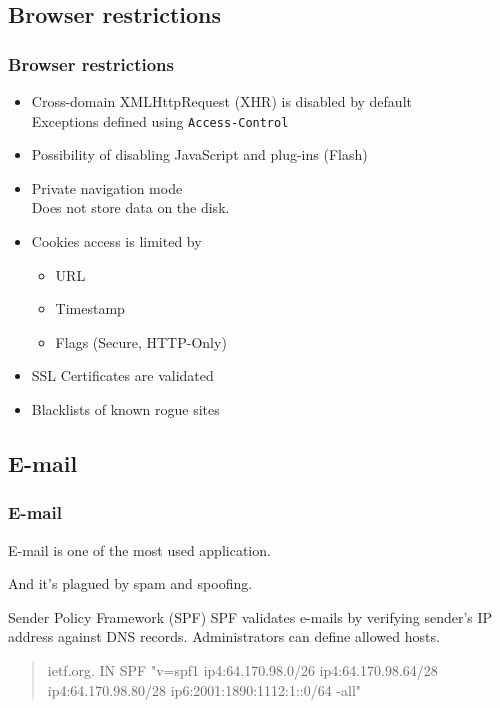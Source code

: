 \subsection{Browser restrictions}

\begin{frame}
\frametitle{Browser restrictions}
\begin{itemize}
\item Cross-domain XMLHttpRequest (XHR) is disabled by default
	\\ Exceptions defined using \texttt{Access-Control}
\item Possibility of disabling JavaScript and plug-ins (Flash)
\item Private navigation mode
	\\ Does not store data on the disk.
\item Cookies access is limited by
	\begin{itemize}
	\item URL
	\item Timestamp
	\item Flags (Secure, HTTP-Only)
	\end{itemize}
\item SSL Certificates are validated
\item Blacklists of known rogue sites
\end{itemize}
\end{frame}

\subsection{E-mail}

\begin{frame}
\frametitle{E-mail}
\begin{center}
E-mail is one of the most used application.
\par
And it's plagued by spam and spoofing.
\end{center}
\begin{block}{Sender Policy Framework (SPF)}
SPF validates e-mails by verifying sender's IP address against DNS records.
Administrators can define allowed hosts.
\begin{quote}
ietf.org. IN SPF "v=spf1 ip4:64.170.98.0/26 ip4:64.170.98.64/28 ip4:64.170.98.80/28 ip6:2001:1890:1112:1::0/64 -all"
\end{quote}
\end{block}
\end{frame}

